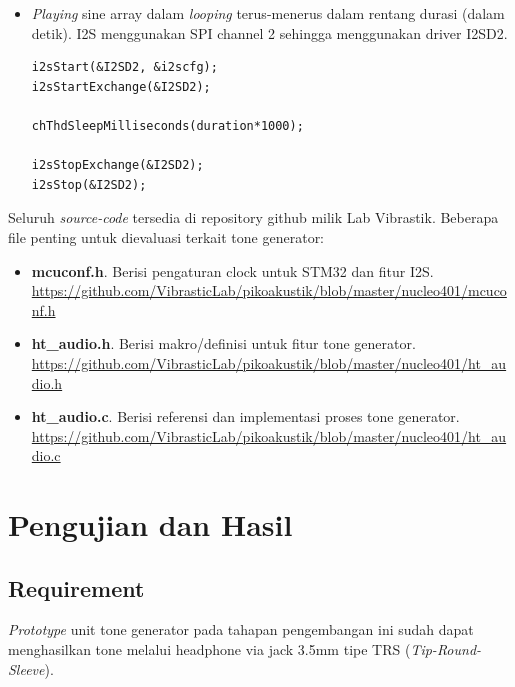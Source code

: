 \documentclass[12pt,]{article}
\begin{document}
\begin{itemize}
		\item \textit{Playing} sine array dalam \textit{looping}
		terus-menerus dalam rentang durasi (dalam detik).
		I2S menggunakan SPI channel 2 sehingga menggunakan driver I2SD2.
		\begin{verbatim}
i2sStart(&I2SD2, &i2scfg);
i2sStartExchange(&I2SD2);

chThdSleepMilliseconds(duration*1000);

i2sStopExchange(&I2SD2);
i2sStop(&I2SD2);
		\end{verbatim}
	\end{itemize}

	Seluruh \textit{source-code} tersedia di repository github milik Lab Vibrastik.
	Beberapa file penting untuk dievaluasi terkait tone generator:

	\begin{itemize}
		\item \textbf{mcuconf.h}. Berisi pengaturan clock untuk STM32 dan fitur I2S.\\
		\url{https://github.com/VibrasticLab/pikoakustik/blob/master/nucleo401/mcuconf.h}

		\item \textbf{ht\_audio.h}. Berisi makro/definisi untuk fitur tone generator.\\
		\url{https://github.com/VibrasticLab/pikoakustik/blob/master/nucleo401/ht_audio.h}

		\item \textbf{ht\_audio.c}. Berisi referensi dan implementasi proses tone generator.\\
		\url{https://github.com/VibrasticLab/pikoakustik/blob/master/nucleo401/ht_audio.c}
	\end{itemize}

	\newpage
	\section{Pengujian dan Hasil}

	\subsection{Requirement}
	\textit{Prototype} unit tone generator pada tahapan pengembangan ini sudah dapat
	menghasilkan tone melalui headphone via jack 3.5mm tipe TRS (\textit{Tip-Round-Sleeve}).
\end{document}
